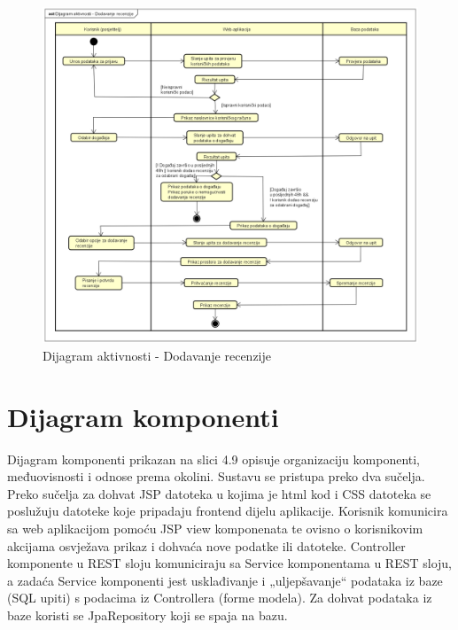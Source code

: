 				\begin{figure}[H]
					\includegraphics[width=\linewidth]{slike/dijagram_akrivnosti.PNG}
					\centering
					\caption{Dijagram aktivnosti - Dodavanje recenzije}
					\label{fig:dijagram}
				\end{figure}
			
			\eject
		
		\section{Dijagram komponenti}
		
		\normalfont Dijagram komponenti prikazan na slici 4.9  opisuje organizaciju komponenti, međuovisnosti i odnose prema okolini. Sustavu se pristupa preko dva sučelja. Preko sučelja za dohvat JSP datoteka u kojima je html kod i CSS datoteka se poslužuju datoteke koje pripadaju frontend dijelu aplikacije. Korisnik komunicira sa web aplikacijom pomoću JSP view komponenata te ovisno o korisnikovim akcijama osvježava prikaz i dohvaća nove podatke ili datoteke. Controller komponente u REST sloju komuniciraju sa Service komponentama u REST sloju, a zadaća Service komponenti jest usklađivanje i „uljepšavanje“ podataka iz baze (SQL upiti) s podacima iz Controllera (forme modela). Za dohvat podataka iz baze koristi se JpaRepository koji se spaja na bazu. 
		
